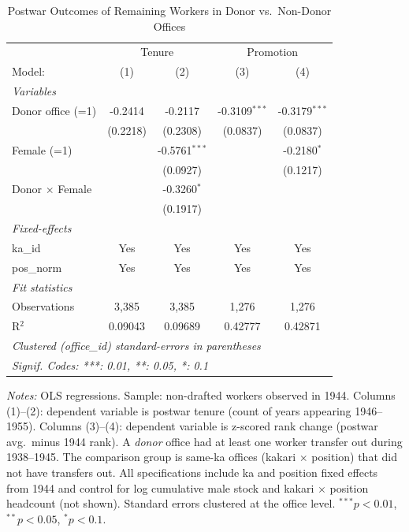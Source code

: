 \begin{table}[htbp]
\centering
\caption{Postwar Outcomes of Remaining Workers in Donor vs.\ Non-Donor Offices}
\label{tab:donor_postwar}
\begin{threeparttable}
\begin{tabular}{lcccc}
   \tabularnewline \midrule \midrule
    & \multicolumn{2}{c}{Tenure} & \multicolumn{2}{c}{Promotion} \\ 
   Model:                 & (1)      & (2)             & (3)             & (4)\\  
   \midrule
   \emph{Variables}\\
   Donor office (=1)      & -0.2414  & -0.2117         & -0.3109$^{***}$ & -0.3179$^{***}$\\   
                          & (0.2218) & (0.2308)        & (0.0837)        & (0.0837)\\   
   Female (=1)            &          & -0.5761$^{***}$ &                 & -0.2180$^{*}$\\   
                          &          & (0.0927)        &                 & (0.1217)\\   
   Donor $\times$ Female  &          & -0.3260$^{*}$   &                 &   \\   
                          &          & (0.1917)        &                 &   \\   
   \midrule
   \emph{Fixed-effects}\\
   ka\_id                 & Yes      & Yes             & Yes             & Yes\\  
   pos\_norm              & Yes      & Yes             & Yes             & Yes\\  
   \midrule
   \emph{Fit statistics}\\
   Observations           & 3,385    & 3,385           & 1,276           & 1,276\\  
   R$^2$                  & 0.09043  & 0.09689         & 0.42777         & 0.42871\\  
   \midrule \midrule
   \multicolumn{5}{l}{\emph{Clustered (office\_id) standard-errors in parentheses}}\\
   \multicolumn{5}{l}{\emph{Signif. Codes: ***: 0.01, **: 0.05, *: 0.1}}\\
\end{tabular}
\begin{tablenotes}[flushleft]
\footnotesize
\item \textit{Notes:} OLS regressions. Sample: non-drafted workers observed in 1944. Columns (1)--(2): dependent variable is postwar tenure (count of years appearing 1946--1955). Columns (3)--(4): dependent variable is z-scored rank change (postwar avg.\ minus 1944 rank). A \emph{donor} office had at least one worker transfer out during 1938--1945. The comparison group is same-ka offices (kakari $\times$ position) that did not have transfers out. All specifications include ka and position fixed effects from 1944 and control for log cumulative male stock and kakari $\times$ position headcount (not shown). Standard errors clustered at the office level. $^{***}p<0.01$, $^{**}p<0.05$, $^{*}p<0.1$.
\end{tablenotes}
\end{threeparttable}
\end{table}
